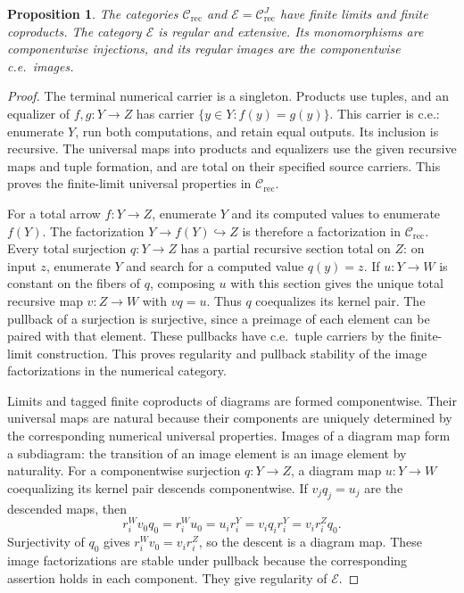 \documentclass[11pt]{article}
\newtheorem{proposition}[theorem]{Proposition}
\begin{document}
\begin{proposition}\label{prop:fork-total}
The categories $\mathcal C_{\mathrm{rec}}$ and
$\mathcal E=\mathcal C_{\mathrm{rec}}^J$ have finite limits and
finite coproducts. The category $\mathcal E$ is regular and
extensive. Its monomorphisms are componentwise injections, and its
regular images are the componentwise c.e.\ images.
\end{proposition}
\begin{proof}
The terminal numerical carrier is a singleton. Products use tuples,
and an equalizer of $f,g:Y\to Z$ has carrier
$\{y\in Y:f(y)=g(y)\}$. This carrier is c.e.: enumerate $Y$, run
both computations, and retain equal outputs. Its inclusion is
recursive. The universal maps into products and equalizers use the
given recursive maps and tuple formation, and are total on their
specified source carriers. This proves the finite-limit universal
properties in $\mathcal C_{\mathrm{rec}}$.

For a total arrow $f:Y\to Z$, enumerate $Y$ and its computed
values to enumerate $f(Y)$. The factorization
$Y\to f(Y)\hookrightarrow Z$ is therefore a factorization in
$\mathcal C_{\mathrm{rec}}$. Every total surjection
$q:Y\to Z$ has a partial recursive section total on $Z$: on input
$z$, enumerate $Y$ and search for a computed value $q(y)=z$.
If $u:Y\to W$ is constant on the fibers of $q$, composing $u$
with this section gives the unique total recursive map
$v:Z\to W$ with $vq=u$. Thus $q$ coequalizes its kernel pair.
The pullback of a surjection is surjective, since a preimage of
each element can be paired with that element. These pullbacks
have c.e.\ tuple carriers by the finite-limit construction.
This proves regularity and pullback stability of the image
factorizations in the numerical category.

Limits and tagged finite coproducts of diagrams are formed
componentwise. Their universal maps are natural because their
components are uniquely determined by the corresponding numerical
universal properties. Images of a diagram map form a subdiagram:
the transition of an image element is an image element by naturality.
For a componentwise surjection $q:Y\to Z$, a diagram map
$u:Y\to W$ coequalizing its kernel pair descends componentwise.
If $v_jq_j=u_j$ are the descended maps, then
\[
 r_i^Wv_0q_0=r_i^Wu_0=u_i r_i^Y
 =v_iq_i r_i^Y=v_i r_i^Zq_0.
\]
Surjectivity of $q_0$ gives $r_i^Wv_0=v_i r_i^Z$, so the
descent is a diagram map. These image factorizations are stable
under pullback because the corresponding assertion holds in
each component. They give regularity of $\mathcal E$.


\end{proof}
\end{document}
